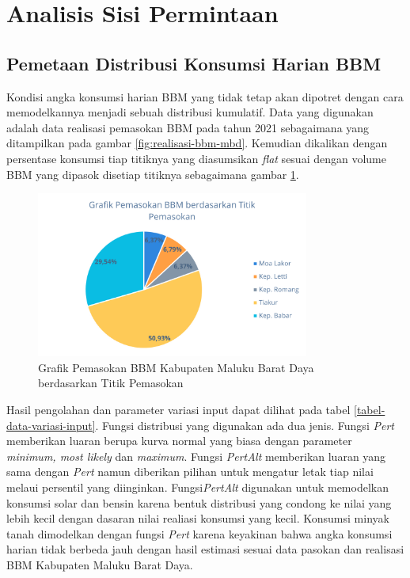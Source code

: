\section{Analisis Sisi Permintaan}
\label{sec:Analisis-Demand-Side}


\subsection{Pemetaan Distribusi Konsumsi Harian BBM}
\label{subsec:variasi-konsumsi-bbm-day}

Kondisi angka konsumsi harian BBM yang tidak tetap akan dipotret dengan cara memodelkannya menjadi sebuah distribusi kumulatif. Data yang digunakan adalah data realisasi pemasokan BBM pada tahun 2021 sebagaimana yang ditampilkan pada gambar \ref{fig:realisasi-bbm-mbd}. Kemudian dikalikan dengan persentase konsumsi tiap titiknya yang diasumsikan \emph{flat} sesuai dengan volume BBM yang dipasok disetiap titiknya sebagaimana gambar \ref{fig:grafik-rasio-pskan-antar-daerah}.

\begin{figure}[ht!]
    \centering
    \includegraphics[width=0.8\textwidth]{gambar/rasio-psokan-bbm-mbd.png}
    \caption{Grafik Pemasokan BBM Kabupaten Maluku Barat Daya berdasarkan Titik Pemasokan}
    \label{fig:grafik-rasio-pskan-antar-daerah}
\end{figure}

Hasil pengolahan dan parameter variasi input dapat dilihat pada tabel \ref{tabel-data-variasi-input}. Fungsi distribusi yang digunakan ada dua jenis. Fungsi \emph{Pert} memberikan luaran berupa kurva normal yang biasa dengan parameter \emph{minimum, most likely} dan \emph{maximum}. Fungsi \emph{PertAlt} memberikan luaran yang sama dengan \emph{Pert} namun diberikan pilihan untuk mengatur letak tiap nilai melaui persentil yang diinginkan. Fungsi\emph{PertAlt} digunakan untuk memodelkan konsumsi solar dan bensin karena bentuk distribusi yang condong ke nilai yang lebih kecil dengan dasaran nilai realiasi konsumsi yang kecil. Konsumsi minyak tanah dimodelkan dengan fungsi \emph{Pert} karena keyakinan bahwa angka konsumsi harian tidak berbeda jauh dengan hasil estimasi sesuai data pasokan dan realisasi BBM Kabupaten Maluku Barat Daya.

